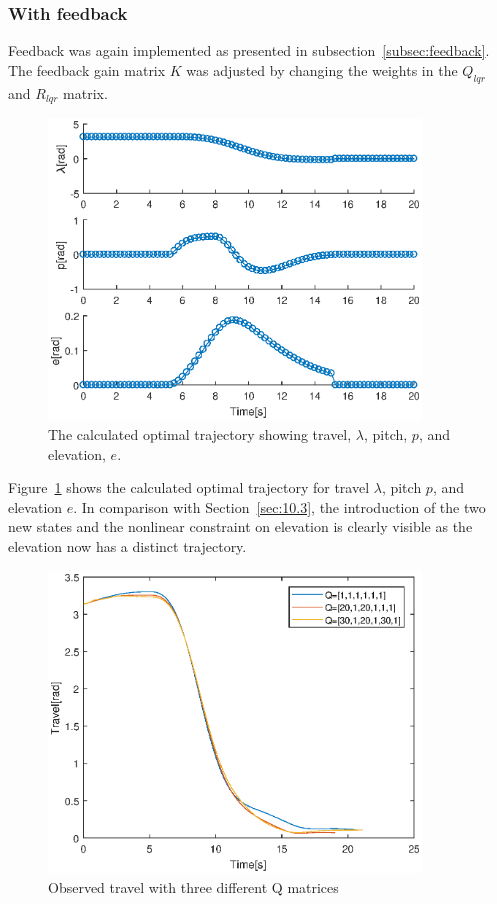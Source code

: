\subsubsection{With feedback}

Feedback was again implemented as presented in subsection~\ref{subsec:feedback}. The feedback gain matrix $K$ was adjusted by changing the weights in the $Q_{lqr}$ and $R_{lqr}$ matrix. 

\begin{figure}[H]
\includegraphics[width=1\linewidth, height=8cm]{data_10.4/states_eps.eps} 
\centering
\caption{The calculated optimal trajectory showing travel, $\lambda$, pitch, $p$, and elevation, $e$.}\label{fig:states_1}
\end{figure}

Figure~\ref{fig:states_1} shows the calculated optimal trajectory for travel $\lambda$, pitch $p$, and elevation $e$. In comparison with   Section~\ref{sec:10.3}, the introduction of the two new states and the nonlinear constraint on elevation is clearly visible as the elevation now has a distinct trajectory. 

\begin{figure}[H]
\includegraphics[width=1\linewidth, height=8cm]{data_10.4/travel_eps.eps} 
\centering
\caption{Observed travel with three different Q matrices}\label{fig:travel1}
\end{figure}

